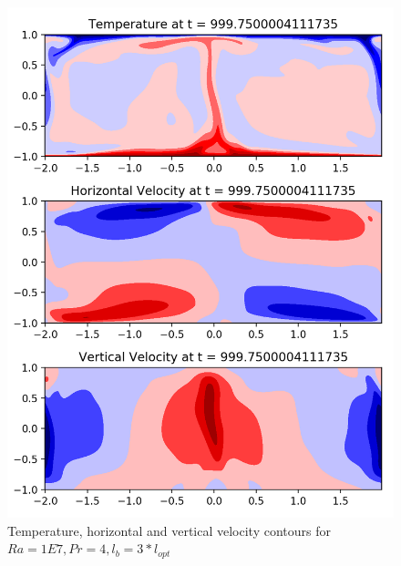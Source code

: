 \documentclass[12pt]{article}
\begin{document}
      \begin{figure}[!htb]
      	\includegraphics[width=\linewidth]{contours_1E7_4_3.png}
      	\caption{Temperature, horizontal and vertical velocity contours for $Ra = 1E7, Pr =4, l_b = 3* l_{opt} $ }
      	\label{fig:fig8}
      	\end{figure}
      	
\end{document}
